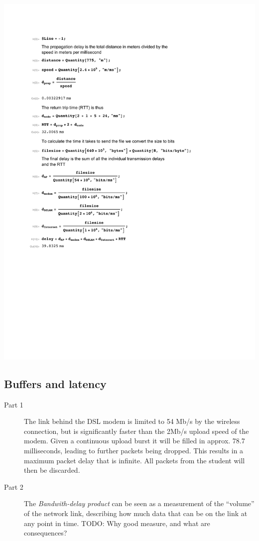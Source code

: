 \documentclass[a4paper]{article}
\begin{document}
\includegraphics{../calc2.pdf}

\subsection{Buffers and latency}
\begin{description}
    \item[Part 1] The link behind the DSL modem is limited to 54 Mb/s by the
        wireless connection, but is significantly faster than the 2Mb/s upload
        speed of the modem. Given a continuous upload burst it will be filled
        in approx. 78.7 milliseconds, leading to further packets being dropped.
        This results in a maximum packet delay that is infinite. All packets
        from the student will then be discarded.
    \item[Part 2] The \emph{Bandwith-delay product} can be seen as a
        measurement of the ``volume'' of the network link, describing how much
        data that can be on the link at any point in time. TODO: Why good
        measure, and what are consequences?
\end{description}
\end{document}

